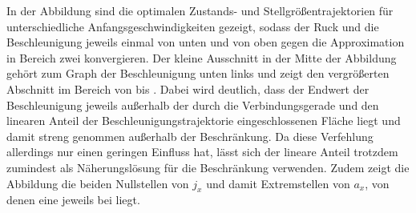 In der Abbildung sind die optimalen Zustands- und Stellgrößentrajektorien für unterschiedliche Anfangsgeschwindigkeiten gezeigt, sodass der Ruck und die Beschleunigung jeweils einmal von unten und von oben gegen die Approximation in Bereich zwei konvergieren. Der kleine Ausschnitt in der Mitte der Abbildung gehört zum Graph der Beschleunigung unten links und zeigt den vergrößerten Abschnitt im Bereich von  bis . Dabei wird deutlich, dass der Endwert der Beschleunigung jeweils außerhalb der durch die Verbindungsgerade und den linearen Anteil der Beschleunigungstrajektorie eingeschlossenen Fläche liegt und damit streng genommen außerhalb der Beschränkung. Da diese Verfehlung allerdings nur einen geringen Einfluss hat, lässt sich der lineare Anteil trotzdem zumindest als Näherungslösung für die Beschränkung verwenden. Zudem zeigt die Abbildung die beiden Nullstellen von $j_x$ und damit Extremstellen von $a_x$, von denen eine jeweils bei liegt.

